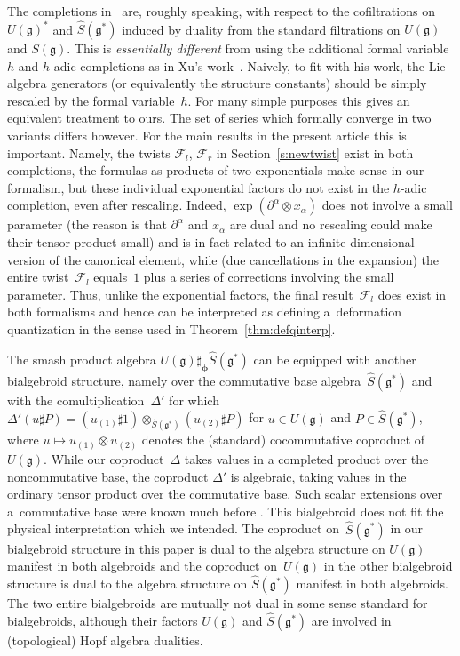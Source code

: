\documentclass[pdftex]{sigma}
\def\gg{\mathfrak{g}}
\numberwithin{equation}{section}
\begin{document}
\begin{Remark}\label{rem:wcompl}
The completions in~\cite{halg} are, roughly speaking, with respect to the cofiltrations on $U(\gg)^*$ and $\hat{S}(\gg^*)$ induced by duality from the standard filtrations on $U(\gg)$ and $S(\gg)$. This is {\em essentially different} from using the additional formal variable $h$ and $h$-adic completions as in Xu's work~\cite{xu}. Naively, to fit with his work, the Lie algebra generators (or equivalently the structure constants)
should be simply rescaled by the formal variable~$h$. For many simple purposes this gives an equivalent treatment to ours. The set of series which formally converge in two variants differs however. For the main results in the present article this is important. Namely, the twists $\mathcal{F}_l$, $\mathcal{F}_r$ in Section~\ref{s:newtwist} exist in both completions, the formulas as products of two exponentials make sense in our formalism, but these individual exponential factors do not exist in the $h$-adic completion, even after rescaling. Indeed, $\exp(\partial^\alpha\otimes x_\alpha)$ does not involve a small parameter (the reason is that $\partial^\alpha$ and $x_\alpha$ are dual and no rescaling could make their tensor product small) and is in fact related to an infinite-dimensional version of the canonical element, while (due cancellations in the expansion) the entire twist~$\mathcal{F}_l$ equals~$1$ plus a series of corrections involving the small parameter. Thus, unlike the exponential factors, the final result~$\mathcal{F}_l$ does exist in both formalisms and hence can be interpreted as defining a~deformation quantization in the sense used in Theorem~\ref{thm:defqinterp}.
\end{Remark}
\begin{Remark}The smash product algebra $U(\gg)\sharp_{{\boldsymbol \phi}}\hat{S}(\gg^*)$ can be equipped with another bialgebroid structure, namely over the commutative base algebra~$\hat{S}(\gg^*)$ and with the comultiplication~$\Delta'$ for which $\Delta'(u\sharp P) = (u_{(1)}\sharp 1)\otimes_{\hat{S}(\gg^*)}(u_{(2)}\sharp P)$ for $u\in U(\gg)$ and $P\in\hat{S}(\gg^*)$, where $u\mapsto u_{(1)}\otimes u_{(2)}$ denotes the (standard) cocommutative coproduct of $U(\gg)$. While our co\-pro\-duct~$\Delta$ takes values in a completed product over the noncommutative base, the coproduct $\Delta'$ is algebraic, taking values in the ordinary tensor product over the commutative base. Such scalar extensions over a~commutative base were known much before \cite[pp.~117--118]{Sweedler}. This bialgebroid does not fit the physical interpretation which we intended. The coproduct on~$\hat{S}(\gg^*)$ in our bialgebroid structure in this paper is dual to the algebra structure on $U(\gg)$ manifest in both algebroids and the coproduct on~$U(\gg)$ in the other bialgebroid structure is dual to the algebra structure on $\hat{S}(\gg^*)$ manifest in both algebroids. The two entire bialgebroids are mutually not dual in some sense standard for bialgebroids, although their factors $U(\gg)$ and $\hat{S}(\gg^*)$ are involved in (topological) Hopf algebra dualities.
\end{Remark}
\end{document}

